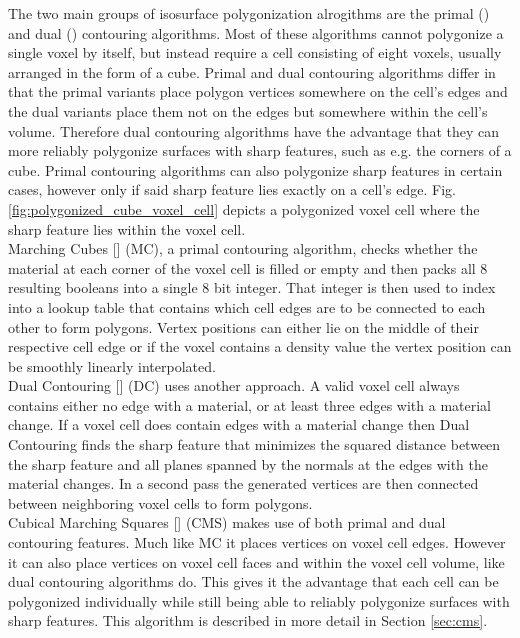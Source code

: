 
The two main groups of isosurface polygonization alrogithms are the primal () and dual () contouring algorithms.
Most of these algorithms cannot polygonize a single voxel by itself, but instead require a cell consisting of eight voxels, usually arranged in the form
of a cube. Primal and dual contouring algorithms differ in that the primal variants place polygon vertices somewhere on the cell's edges and the dual variants
place them not on the edges but somewhere within the cell's volume. Therefore dual contouring algorithms have the advantage that they can more reliably polygonize
surfaces with sharp features, such as e.g. the corners of a cube. Primal contouring algorithms can also polygonize sharp features in certain cases, however only
if said sharp feature lies exactly on a cell's edge. Fig. \ref{fig:polygonized_cube_voxel_cell} depicts a polygonized voxel cell where the sharp feature lies within
the voxel cell.\\
Marching Cubes [] (MC), a primal contouring algorithm, checks whether the material at each corner of the voxel cell is filled or empty and then 
packs all 8 resulting booleans into a single 8 bit integer. That integer is then used to index into a lookup table that contains which cell edges are to be connected to
each other to form polygons. Vertex positions can either lie on the middle of their respective cell edge or if the voxel contains a density value the vertex position
can be smoothly linearly interpolated.\\
Dual Contouring [] (DC) uses another approach. A valid voxel cell always contains either no edge with a material, or at least three edges with a material change. If a voxel cell
does contain edges with a material change then Dual Contouring finds the sharp feature that minimizes the squared distance between the sharp feature and all planes spanned
by the normals at the edges with the material changes. In a second pass the generated vertices are then connected between neighboring voxel cells to form polygons.\\
Cubical Marching Squares [] (CMS) makes use of both primal and dual contouring features. Much like MC it places vertices on voxel cell edges. However it can also place vertices
on voxel cell faces and within the voxel cell volume, like dual contouring algorithms do. This gives it the advantage that each cell can be polygonized individually while still being able to
reliably polygonize surfaces with sharp features. This algorithm is described in more detail in Section \ref{sec:cms}.

